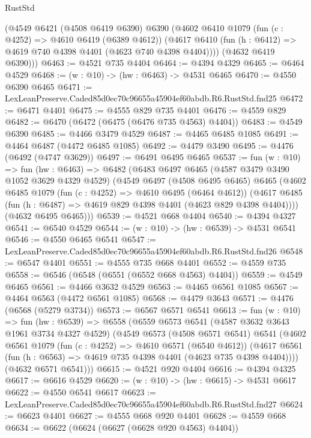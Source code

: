 \begin{lexlean}{RustStd}
\begin{coremodule}
      (@4549
        @6421
        (@4508 @6419 @6390)
        @6390
        (@4602
          @6410
          @1079
          (fun (c : @4252) => @4610 @6419 (@6389 @4612))
          (@4617 @6410 (fun (h : @6412) => @4619 @740 @4398 @4401 (@4623 @740 @4398 @4404))))
        (@4632 @6419 @6390)))
@6463 := @4521 @735 @4404
@6464 := @4394 @4329
@6465 := @6464 @4529
@6468 := (w : @10) -> (hw : @6463) -> @4531 @6465
@6470 := @4550 @6390 @6465
@6471 := LexLeanPreserve.Caded85d0ec70c96655a45904ef60abdb.R6.RustStd.fnd25
@6472 := @6471 @4401
@6475 := @4555 @829 @735 @4401
@6476 := @4559 @829
@6482 := @6470 (@6472 (@6475 (@6476 @735 @4563) @4404))
@6483 := @4549 @6390
@6485 := @4466 @3479 @4529
@6487 := @4465 @6485 @1085
@6491 := @4464 @6487 (@4472 @6485 @1085)
@6492 := @4479 @3490
@6495 := @4476 (@6492 (@4747 @3629))
@6497 := @6491 @6495 @6465
@6537 := fun (w : @10) =>
  fun (hw : @6463) =>
  @6482
    (@6483
      @6497
      @6465
      (@4587 @3479 @3490 @1052 @3629 @4329 @4529)
      (@4549
        @6497
        (@4508 @6495 @6465)
        @6465
        (@4602
          @6485
          @1079
          (fun (c : @4252) => @4610 @6495 (@6464 @4612))
          (@4617 @6485 (fun (h : @6487) => @4619 @829 @4398 @4401 (@4623 @829 @4398 @4404))))
        (@4632 @6495 @6465)))
@6539 := @4521 @668 @4404
@6540 := @4394 @4327
@6541 := @6540 @4529
@6544 := (w : @10) -> (hw : @6539) -> @4531 @6541
@6546 := @4550 @6465 @6541
@6547 := LexLeanPreserve.Caded85d0ec70c96655a45904ef60abdb.R6.RustStd.fnd26
@6548 := @6547 @4401
@6551 := @4555 @735 @668 @4401
@6552 := @4559 @735
@6558 := @6546 (@6548 (@6551 (@6552 @668 @4563) @4404))
@6559 := @4549 @6465
@6561 := @4466 @3632 @4529
@6563 := @4465 @6561 @1085
@6567 := @4464 @6563 (@4472 @6561 @1085)
@6568 := @4479 @3643
@6571 := @4476 (@6568 (@5279 @3734))
@6573 := @6567 @6571 @6541
@6613 := fun (w : @10) =>
  fun (hw : @6539) =>
  @6558
    (@6559
      @6573
      @6541
      (@4587 @3632 @3643 @1961 @3734 @4327 @4529)
      (@4549
        @6573
        (@4508 @6571 @6541)
        @6541
        (@4602
          @6561
          @1079
          (fun (c : @4252) => @4610 @6571 (@6540 @4612))
          (@4617 @6561 (fun (h : @6563) => @4619 @735 @4398 @4401 (@4623 @735 @4398 @4404))))
        (@4632 @6571 @6541)))
@6615 := @4521 @920 @4404
@6616 := @4394 @4325
@6617 := @6616 @4529
@6620 := (w : @10) -> (hw : @6615) -> @4531 @6617
@6622 := @4550 @6541 @6617
@6623 := LexLeanPreserve.Caded85d0ec70c96655a45904ef60abdb.R6.RustStd.fnd27
@6624 := @6623 @4401
@6627 := @4555 @668 @920 @4401
@6628 := @4559 @668
@6634 := @6622 (@6624 (@6627 (@6628 @920 @4563) @4404))

\end{coremodule}
\end{lexlean}
